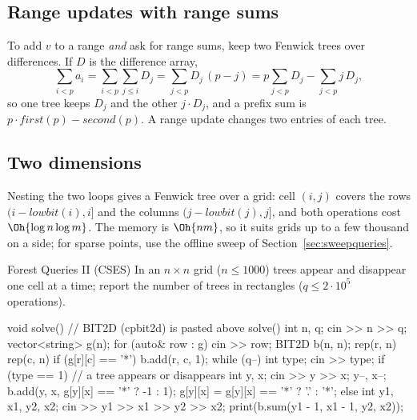 \subsection{Range updates with range sums}

To add $v$ to a range \emph{and} ask for range sums, keep two Fenwick trees over differences. If $D$ is the difference array,
\[ \sum_{i < p} a_i = \sum_{i < p} \sum_{j \le i} D_j = \sum_{j < p} D_j\,(p - j) = p \sum_{j < p} D_j - \sum_{j < p} j\,D_j, \]
so one tree keeps $D_j$ and the other $j \cdot D_j$, and a prefix sum is $p \cdot \mathit{first}(p) - \mathit{second}(p)$. A range
update changes two entries of each tree.


\subsection{Two dimensions}

Nesting the two loops gives a Fenwick tree over a grid: cell $(i, j)$ covers the rows $(i - \mathit{lowbit}(i), i]$ and the columns
$(j - \mathit{lowbit}(j), j]$, and both operations cost $\Oh{\log n \log m}$. The memory is $\Oh{nm}$, so it suits grids up to a few
thousand on a side; for sparse points, use the offline sweep of Section~\ref{sec:sweepqueries}.

\begin{problem}{Forest Queries II (CSES)}
In an $n \times n$ grid ($n \le 1000$) trees appear and disappear one cell at a time; report the number of trees in rectangles
($q \le 2 \cdot 10^5$ operations).
\end{problem}

\begin{code}
void solve() {  // BIT2D (cpbit2d) is pasted above solve()
    int n, q;
    cin >> n >> q;
    vector<string> g(n);
    for (auto& row : g) cin >> row;
    BIT2D b(n, n);
    rep(r, n) rep(c, n) if (g[r][c] == '*') b.add(r, c, 1);
    while (q--) {
        int type;
        cin >> type;
        if (type == 1) {  // a tree appears or disappears
            int y, x;
            cin >> y >> x;
            y--, x--;
            b.add(y, x, g[y][x] == '*' ? -1 : 1);
            g[y][x] = g[y][x] == '*' ? '.' : '*';
        } else {
            int y1, x1, y2, x2;
            cin >> y1 >> x1 >> y2 >> x2;
            print(b.sum(y1 - 1, x1 - 1, y2, x2));
        }
    }
}
\end{code}

